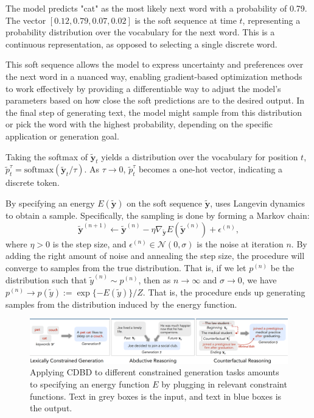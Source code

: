 \documentclass{article}
\begin{document}
The model predicts "cat" as the most likely next word with a probability of 0.79. The vector \([0.12, 0.79, 0.07, 0.02]\) is the soft sequence at time \(t\), representing a probability distribution over the vocabulary for the next word. This is a continuous representation, as opposed to selecting a single discrete word.

This soft sequence allows the model to express uncertainty and preferences over the next word in a nuanced way, enabling gradient-based optimization methods to work effectively by providing a differentiable way to adjust the model's parameters based on how close the soft predictions are to the desired output. In the final step of generating text, the model might sample from this distribution or pick the word with the highest probability, depending on the specific application or generation goal.

Taking the softmax of $\tilde{\boldsymbol{y}}_t$ yields a distribution over the vocabulary for position $t$, $\tilde{p}_t^\tau = \text{softmax}(\tilde{\boldsymbol{y}}_t/\tau)$. As $\tau \rightarrow 0$, $\tilde{p}_t^\tau$ becomes a one-hot vector, indicating a discrete token.

By specifying an energy $E(\tilde{\boldsymbol{y}})$ on the soft sequence $\tilde{\boldsymbol{y}}$, \cite[COLD]{cold} uses Langevin dynamics to obtain a sample. Specifically, the sampling is done by forming a Markov chain:
\begin{equation}
    \tilde{\boldsymbol{y}}^{(n+1)} \leftarrow \tilde{\boldsymbol{y}}^{(n)} - \eta \nabla_{\tilde{\boldsymbol{y}}} E(\tilde{\boldsymbol{y}}^{(n)}) + \epsilon^{(n)},
    \label{eq:langevin}
\end{equation}
where $\eta > 0$ is the step size, and $\epsilon^{(n)} \in \mathcal{N}(0, \sigma)$ is the noise at iteration $n$. By adding the right amount of noise and annealing the step size, the procedure will converge to samples from the true distribution. That is, if we let $p^{(n)}$ be the distribution such that $\tilde{y}^{(n)} \sim p^{(n)}$, then as $n \rightarrow \infty$ and $\sigma \rightarrow 0$, we have $p^{(n)} \rightarrow p(\tilde{y}) := \exp\{-E(\tilde{y})\}/Z$. That is, the procedure ends up generating samples from the distribution induced by the energy function.

\begin{figure}[h!]
    \centering
    \includegraphics[width=1\textwidth]{fig-1.png}
    \caption{Applying CDBD to different constrained generation tasks amounts to specifying an energy function $E$ by plugging in relevant constraint functions. Text in grey boxes is the input, and text in blue boxes is the output.}
    \label{fig:constrained_generation}
\end{figure}
\end{document}
